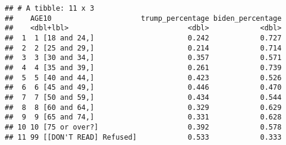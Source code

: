 \documentclass[
]{article}
\begin{document}
\begin{verbatim}
## # A tibble: 11 x 3
##    AGE10                     trump_percentage biden_percentage
##    <dbl+lbl>                            <dbl>            <dbl>
##  1  1 [18 and 24,]                      0.242            0.727
##  2  2 [25 and 29,]                      0.214            0.714
##  3  3 [30 and 34,]                      0.357            0.571
##  4  4 [35 and 39,]                      0.261            0.739
##  5  5 [40 and 44,]                      0.423            0.526
##  6  6 [45 and 49,]                      0.446            0.470
##  7  7 [50 and 59,]                      0.434            0.544
##  8  8 [60 and 64,]                      0.329            0.629
##  9  9 [65 and 74,]                      0.331            0.628
## 10 10 [75 or over?]                     0.392            0.578
## 11 99 [[DON'T READ] Refused]            0.533            0.333
\end{verbatim}
\end{document}
